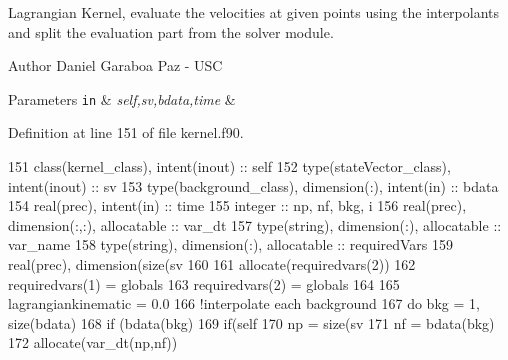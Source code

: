 Lagrangian Kernel, evaluate the velocities at given points using the interpolants and split the evaluation part from the solver module. 

\begin{DoxyAuthor}{Author}
Daniel Garaboa Paz -\/ U\+SC 
\end{DoxyAuthor}

\begin{DoxyParams}[1]{Parameters}
\mbox{\tt in}  & {\em self,sv,bdata,time} & \\
\hline
\end{DoxyParams}


Definition at line 151 of file kernel.\+f90.


\begin{DoxyCode}
151     \textcolor{keywordtype}{class}(kernel\_class), \textcolor{keywordtype}{intent(inout)} :: self
152     \textcolor{keywordtype}{type}(stateVector\_class), \textcolor{keywordtype}{intent(inout)} :: sv
153     \textcolor{keywordtype}{type}(background\_class), \textcolor{keywordtype}{dimension(:)}, \textcolor{keywordtype}{intent(in)} :: bdata
154     \textcolor{keywordtype}{real(prec)}, \textcolor{keywordtype}{intent(in)} :: time
155     \textcolor{keywordtype}{integer} :: np, nf, bkg, i
156     \textcolor{keywordtype}{real(prec)}, \textcolor{keywordtype}{dimension(:,:)}, \textcolor{keywordtype}{allocatable} :: var\_dt
157     \textcolor{keywordtype}{type}(string), \textcolor{keywordtype}{dimension(:)}, \textcolor{keywordtype}{allocatable} :: var\_name
158     \textcolor{keywordtype}{type}(string), \textcolor{keywordtype}{dimension(:)}, \textcolor{keywordtype}{allocatable} :: requiredVars
159     \textcolor{keywordtype}{real(prec)}, \textcolor{keywordtype}{dimension(size(sv%
160 
161     \textcolor{keyword}{allocate}(requiredvars(2))
162     requiredvars(1) = globals%
163     requiredvars(2) = globals%
164 
165     lagrangiankinematic = 0.0
166     \textcolor{comment}{!interpolate each background}
167     \textcolor{keywordflow}{do} bkg = 1, \textcolor{keyword}{size}(bdata)
168         \textcolor{keywordflow}{if} (bdata(bkg)%
169             \textcolor{keywordflow}{if}(self%
170                 np = \textcolor{keyword}{size}(sv%
171                 nf = bdata(bkg)%
172                 \textcolor{keyword}{allocate}(var\_dt(np,nf))
}
\end{DoxyCode}
